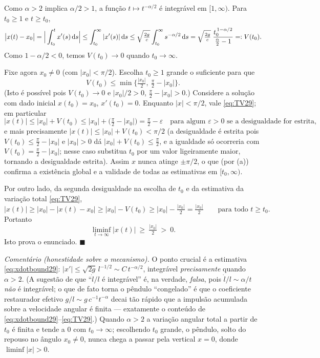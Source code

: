 \begin{enumerate}[label=(\alph*)]
Como $\alpha>2$ implica $\alpha/2>1$, a função $t\mapsto t^{-\alpha/2}$ é integrável em $[1,\infty)$. Para $t_0\ge1$ e $t\ge t_0$,
\begin{equation}\label{eq:TV29}
\big|x(t)-x_0\big|=\Big|\int_{t_0}^{t}x'(s)\,\mathrm{d} s\Big|
\le \int_{t_0}^{\infty}|x'(s)|\,\mathrm{d} s
\le \sqrt{\tfrac{2g}{c}}\int_{t_0}^{\infty}s^{-\alpha/2}\,\mathrm{d} s
=\sqrt{\tfrac{2g}{c}}\;\frac{t_0^{\,1-\alpha/2}}{\tfrac{\alpha}{2}-1}=:V(t_0).
\end{equation}
Como $1-\alpha/2<0$, temos $V(t_0)\to 0$ quando $t_0\to\infty$.

Fixe agora $x_0\neq0$ (com $|x_0|<\pi/2$). Escolha $t_0\ge1$ grande o suficiente para que
\[
V(t_0)\le \min\Big\{\tfrac{|x_0|}{2},\ \tfrac{\pi}{2}-|x_0|\Big\}.
\]
(Isto é possível pois $V(t_0)\to0$ e $|x_0|/2>0$, $\tfrac\pi2-|x_0|>0$.) Considere a solução com dado inicial $x(t_0)=x_0$, $x'(t_0)=0$. Enquanto $|x|<\pi/2$, vale \eqref{eq:TV29}; em particular
\[
|x(t)|\le |x_0|+V(t_0)\le |x_0|+\big(\tfrac\pi2-|x_0|\big)=\tfrac\pi2-\varepsilon\quad\text{para algum }\varepsilon>0\text{ se a desigualdade for estrita,}
\]
e mais precisamente $|x(t)|\le |x_0|+V(t_0)<\pi/2$ (a desigualdade é estrita pois $V(t_0)\le \tfrac\pi2-|x_0|$ e $|x_0|>0$ dá $|x_0|+V(t_0)\le \tfrac\pi2$, e a igualdade só ocorreria com $V(t_0)=\tfrac\pi2-|x_0|$; nesse caso substitua $t_0$ por um valor ligeiramente maior, tornando a desigualdade estrita). Assim $x$ nunca atinge $\pm\pi/2$, o que (por (a)) confirma a existência global e a validade de todas as estimativas em $[t_0,\infty)$.

Por outro lado, da segunda desigualdade na escolha de $t_0$ e da estimativa da variação total \eqref{eq:TV29},
\[
|x(t)|\ge |x_0|-|x(t)-x_0|\ge |x_0|-V(t_0)\ge |x_0|-\tfrac{|x_0|}{2}=\tfrac{|x_0|}{2}\qquad\text{para todo }t\ge t_0.
\]
Portanto
\[
\liminf_{t\to\infty}|x(t)|\ \ge\ \tfrac{|x_0|}{2}\ >\ 0 .
\]
Isto prova o enunciado. \qquad$\blacksquare$

\emph{Comentário (honestidade sobre o mecanismo).} O ponto crucial é a estimativa \eqref{eq:xdotbound29}: $|x'|\le \sqrt{2g}\,l^{-1/2}\sim C\,t^{-\alpha/2}$, integrável \emph{precisamente} quando $\alpha>2$. (A sugestão de que ``$\dot l/l$ é integrável'' é, na verdade, \emph{falsa}, pois $\dot l/l\sim \alpha/t$ \emph{não} é integrável; o que de fato torna o pêndulo ``congelado'' é que o coeficiente restaurador efetivo $g/l\sim g\,c^{-1}t^{-\alpha}$ decai tão rápido que a impulsão acumulada sobre a velocidade angular é finita --- exatamente o conteúdo de \eqref{eq:xdotbound29}--\eqref{eq:TV29}.) Quando $\alpha>2$ a variação angular total a partir de $t_0$ é finita e tende a $0$ com $t_0\to\infty$; escolhendo $t_0$ grande, o pêndulo, solto do repouso no ângulo $x_0\neq0$, nunca chega a passar pela vertical $x=0$, donde $\liminf|x|>0$.

\end{enumerate}


